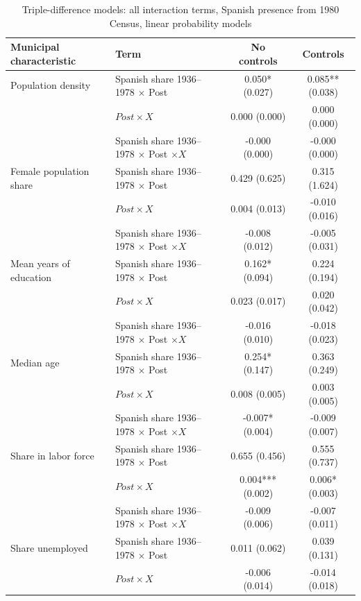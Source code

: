 \begin{table}[!htbp]
\small
\renewcommand{\arraystretch}{1}
\setlength{\tabcolsep}{3pt}
\centering
\caption{Triple-difference models: all interaction terms, Spanish presence from 1980 Census, linear probability models}
\label{tab:triple_pooled_all_c80_lpm_stata}
\captionsetup{justification=centering}
\begin{tabular}{llcc}
\hline
Municipal characteristic & Term & No controls & Controls \\
\hline
Population density & Spanish share 1936--1978 \(\times\) Post & 0.050* (0.027) & 0.085** (0.038) \\
 & \(Post \times X\) & 0.000 (0.000) & 0.000 (0.000) \\
 & Spanish share 1936--1978 \(\times\) Post \(\times X\) & -0.000 (0.000) & -0.000 (0.000) \\
\addlinespace
Female population share & Spanish share 1936--1978 \(\times\) Post & 0.429 (0.625) & 0.315 (1.624) \\
 & \(Post \times X\) & 0.004 (0.013) & -0.010 (0.016) \\
 & Spanish share 1936--1978 \(\times\) Post \(\times X\) & -0.008 (0.012) & -0.005 (0.031) \\
\addlinespace
Mean years of education & Spanish share 1936--1978 \(\times\) Post & 0.162* (0.094) & 0.224 (0.194) \\
 & \(Post \times X\) & 0.023 (0.017) & 0.020 (0.042) \\
 & Spanish share 1936--1978 \(\times\) Post \(\times X\) & -0.016 (0.010) & -0.018 (0.023) \\
\addlinespace
Median age & Spanish share 1936--1978 \(\times\) Post & 0.254* (0.147) & 0.363 (0.249) \\
 & \(Post \times X\) & 0.008 (0.005) & 0.003 (0.005) \\
 & Spanish share 1936--1978 \(\times\) Post \(\times X\) & -0.007* (0.004) & -0.009 (0.007) \\
\addlinespace
Share in labor force & Spanish share 1936--1978 \(\times\) Post & 0.655 (0.456) & 0.555 (0.737) \\
 & \(Post \times X\) & 0.004*** (0.002) & 0.006* (0.003) \\
 & Spanish share 1936--1978 \(\times\) Post \(\times X\) & -0.009 (0.006) & -0.007 (0.011) \\
\addlinespace
Share unemployed & Spanish share 1936--1978 \(\times\) Post & 0.011 (0.062) & 0.039 (0.131) \\
 & \(Post \times X\) & -0.006 (0.014) & -0.014 (0.018) \\

\end{tabular}
\end{table}
